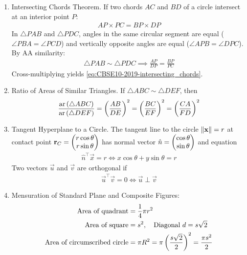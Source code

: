 \documentclass[12pt,a4paper]{article}
\begin{document}
\begin{enumerate}[label=\thesubsection.\arabic*, ref=\thesubsection.\theenumi]
	\item Intersecting Chords Theorem.
	If two chords $AC$ and $BD$ of a circle intersect at an interior point $P$:
	\begin{align}
		AP \times PC = BP \times DP \label{eq:CBSE10-2019-intersecting_chords}
	\end{align}
	\solution
	In $\triangle PAB$ and $\triangle PDC$, angles in the same circular segment are equal ($\angle PBA = \angle PCD$) and vertically opposite angles are equal ($\angle APB = \angle DPC$). By AA similarity:
	\begin{align}
		\triangle PAB \sim \triangle PDC \implies \frac{AP}{DP} = \frac{BP}{PC}
	\end{align}
	Cross-multiplying yields \eqref{eq:CBSE10-2019-intersecting_chords}.
	
	\item Ratio of Areas of Similar Triangles.
	If $\triangle ABC \sim \triangle DEF$, then
	\begin{align}
		\frac{\text{ar}\left(\triangle ABC\right)}{\text{ar}\left(\triangle DEF\right)} = \left(\frac{AB}{DE}\right)^2 = \left(\frac{BC}{EF}\right)^2 = \left(\frac{CA}{FD}\right)^2 \label{eq:CBSE10-2019-similar_triangle_area}
	\end{align}
	
	\item Tangent Hyperplane to a Circle.
	The tangent line to the circle $\left\lVert\mathbf{x}\right\rVert = r$ at contact point $\mathbf{r}_C = \begin{pmatrix}r\cos\theta \\ r\sin\theta\end{pmatrix}$ has normal vector $\hat{n} = \begin{pmatrix}\cos\theta \\ \sin\theta\end{pmatrix}$ and equation
	\begin{align}
		\hat{n}^\top \vec{x} = r \iff x\cos\theta + y\sin\theta = r \label{eq:CBSE10-2019-circle_tangent}
	\end{align}
	Two vectors $\vec{u}$ and $\vec{v}$ are orthogonal if
	\begin{align}
		\vec{u}^\top \vec{v} = 0 \iff \vec{u} \perp \vec{v} \label{eq:CBSE10-2019-orthogonality}
	\end{align}
	
	\item Mensuration of Standard Plane and Composite Figures:
	\begin{align}
		\text{Area of quadrant} &= \frac{1}{4}\pi r^2 \label{eq:CBSE10-2019-quadrant_area} \\
		\text{Area of square} &= s^2, \quad \text{Diagonal } d = s\sqrt{2} \label{eq:CBSE10-2019-square_geometry} \\
		\text{Area of circumscribed circle} &= \pi R^2 = \pi \left(\frac{s\sqrt{2}}{2}\right)^2 = \frac{\pi s^2}{2} \label{eq:CBSE10-2019-circumscribed_circle}
	\end{align}
	

\end{enumerate}
\end{document}
